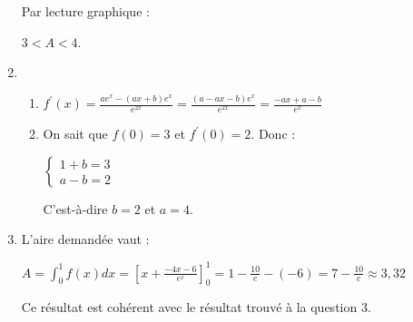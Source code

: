 \begin{corrige}
\begin{enumerate}
\begin{center}
\end{center}
               Par lecture graphique :
               \par
               $3 < A < 4$.
          \item  
          \begin{enumerate} [label=\alph*.]
               \item
               $f^{\prime}\left(x\right)=\frac{ae^{x}-\left(ax+b\right)e^{x}}{e^{2x}}=\frac{\left(a-ax-b\right)e^{x}}{e^{2x}}=\frac{-ax+a-b}{e^{x}}$
\item              
               On sait que $f\left(0\right)=3$ et $f^{\prime}\left(0\right)=2$. Donc :
               \par
               $\left\{ \begin{matrix} 1+b=3 \\ a-b=2 \end{matrix}\right.$
                    \par
                    C'est-à-dire $b=2$ et $a=4$.
          \end{enumerate}      
               \item
               L'aire demandée vaut :
               \par
               $A=\int_{0}^{1}f\left(x\right)dx=\left[x+\frac{-4x-6}{e^{x}}\right]_{0}^{1}=1-\frac{10}{e}-\left(-6\right)=7-\frac{10}{e}\approx 3,32$
               \par
               Ce résultat est cohérent avec le résultat trouvé à la question 3.
    
\end{enumerate}
     \end{corrige}
